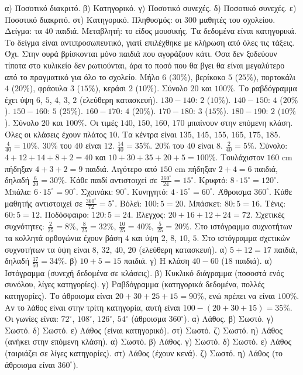  α) Ποσοτικό διακριτό. β) Κατηγορικό. γ) Ποσοτικό συνεχές. δ) Ποσοτικό συνεχές. ε) Ποσοτικό διακριτό. στ) Κατηγορικό.
 Πληθυσμός: οι $300$ μαθητές του σχολείου. Δείγμα: τα $40$ παιδιά. Μεταβλητή: το είδος μουσικής. Τα δεδομένα είναι κατηγορικά. Το δείγμα είναι αντιπροσωπευτικό, γιατί επιλέχθηκε με κλήρωση από όλες τις τάξεις.
 Όχι. Στην ουρά βρίσκονται μόνο παιδιά που αγοράζουν κάτι. Όσα δεν ξοδεύουν τίποτα στο κυλικείο δεν ρωτιούνται, άρα το ποσό που θα βγει θα είναι μεγαλύτερο από το πραγματικό για όλο το σχολείο.
 Μήλο $6$ ($30\%$), βερίκοκο $5$ ($25\%$), πορτοκάλι $4$ ($20\%$), φράουλα $3$ ($15\%$), κεράσι $2$ ($10\%$). Σύνολο $20$ και $100\%$. Το ραβδόγραμμα έχει ύψη $6$, $5$, $4$, $3$, $2$ (ελεύθερη κατασκευή).
 $130-140$: $2$ ($10\%$). $140-150$: $4$ ($20\%$). $150-160$: $5$ ($25\%$). $160-170$: $4$ ($20\%$). $170-180$: $3$ ($15\%$). $180-190$: $2$ ($10\%$). Σύνολο $20$ και $100\%$. Οι τιμές $140$, $150$, $160$, $170$ μπαίνουν στην επόμενη κλάση.
 Όλες οι κλάσεις έχουν πλάτος $10$. Τα κέντρα είναι $135$, $145$, $155$, $165$, $175$, $185$.
 $\frac{4}{40}=10\%$. $30\%$ του $40$ είναι $12$. $\frac{14}{40}=35\%$. $20\%$ του $40$ είναι $8$. $\frac{2}{40}=5\%$. Σύνολο: $4+12+14+8+2=40$ και $10+30+35+20+5=100\%$.
 Τουλάχιστον $160$ cm πήδηξαν $4+3+2=9$ παιδιά. Λιγότερο από $150$ cm πήδηξαν $2+4=6$ παιδιά, δηλαδή $\frac{6}{20}=30\%$.
 Κάθε παιδί αντιστοιχεί σε $\frac{360^\circ}{24}=15^\circ$. Κρυφτό: $8\cdot15^\circ=120^\circ$. Μπάλα: $6\cdot15^\circ=90^\circ$. Σχοινάκι: $90^\circ$. Κυνηγητό: $4\cdot15^\circ=60^\circ$. Άθροισμα $360^\circ$.
 Κάθε μαθητής αντιστοιχεί σε $\frac{360^\circ}{72}=5^\circ$. Βόλεϊ: $100:5=20$. Μπάσκετ: $80:5=16$. Τένις: $60:5=12$. Ποδόσφαιρο: $120:5=24$. Έλεγχος: $20+16+12+24=72$.
 Σχετικές συχνότητες: $\frac{2}{25}=8\%$, $\frac{8}{25}=32\%$, $\frac{10}{25}=40\%$, $\frac{5}{25}=20\%$. Στο ιστόγραμμα συχνοτήτων τα κολλητά ορθογώνια έχουν βάση $4$ και ύψη $2$, $8$, $10$, $5$. Στο ιστόγραμμα σχετικών συχνοτήτων τα ύψη είναι $8$, $32$, $40$, $20$ (ελεύθερη κατασκευή).
 α) $5+12=17$ παιδιά, δηλαδή $\frac{17}{50}=34\%$. β) $10+5=15$ παιδιά. γ) Η κλάση $40-60$ ($18$ παιδιά).
 α) Ιστόγραμμα (συνεχή δεδομένα σε κλάσεις). β) Κυκλικό διάγραμμα (ποσοστά ενός συνόλου, λίγες κατηγορίες). γ) Ραβδόγραμμα (κατηγορικά δεδομένα, πολλές κατηγορίες).
 Το άθροισμα είναι $20+30+25+15=90\%$, ενώ πρέπει να είναι $100\%$. Αν το λάθος είναι στην τρίτη κατηγορία, αυτή είναι $100-(20+30+15)=35\%$. Οι γωνίες είναι: $72^\circ$, $108^\circ$, $126^\circ$, $54^\circ$ (άθροισμα $360^\circ$).
 α) Λάθος. β) Σωστό. γ) Σωστό. δ) Σωστό. ε) Λάθος (είναι κατηγορικό). στ) Σωστό. ζ) Σωστό. η) Λάθος (ανήκει στην επόμενη κλάση).
 α) Σωστό. β) Λάθος. γ) Σωστό. δ) Σωστό. ε) Λάθος (ταιριάζει σε λίγες κατηγορίες). στ) Λάθος (έχουν κενά). ζ) Σωστό. η) Λάθος (το άθροισμα είναι $360^\circ$).
